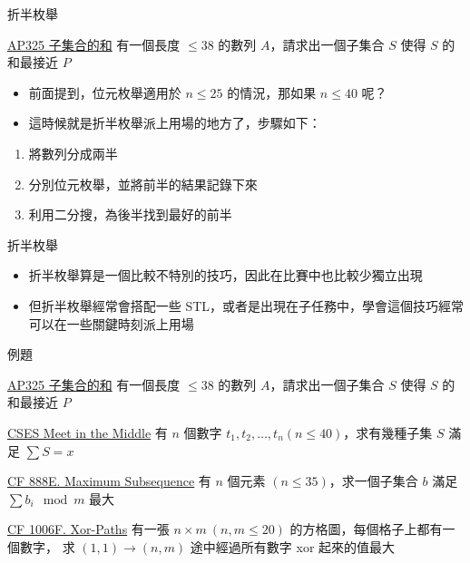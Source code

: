 \documentclass[aspectratio=169]{beamer}
\begin{document}
    \begin{frame}{折半枚舉}
        \begin{block}{\href{https://judge.tcirc.tw/ShowProblem?problemid=d019}{AP325 子集合的和}}
            有一個長度 $\le 38$ 的數列 $A$，請求出一個子集合 $S$ 使得 $S$ 的和最接近 $P$
        \end{block}

        \begin{itemize}
            \item<1-> 前面提到，位元枚舉適用於 $n \le 25$ 的情況，那如果 $n \le 40$ 呢？
            \item<2-> 這時候就是折半枚舉派上用場的地方了，步驟如下：
        \end{itemize}

        \begin{enumerate}
            \item 將數列分成兩半
            \item 分別位元枚舉，並將前半的結果記錄下來
            \item 利用二分搜，為後半找到最好的前半
        \end{enumerate}
    \end{frame}

    \begin{frame}{折半枚舉}
        \begin{itemize}
            \item 折半枚舉算是一個比較不特別的技巧，因此在比賽中也比較少獨立出現
            \item 但折半枚舉經常會搭配一些 STL，或者是出現在子任務中，學會這個技巧經常可以在一些關鍵時刻派上用場
        \end{itemize}
    \end{frame}

    \begin{frame}{例題}
        \begin{block}{\href{https://judge.tcirc.tw/ShowProblem?problemid=d019}{AP325 子集合的和}}
            有一個長度 $\le 38$ 的數列 $A$，請求出一個子集合 $S$ 使得 $S$ 的和最接近 $P$
        \end{block}

        \begin{block}{\href{https://cses.fi/problemset/task/1628/}{CSES Meet in the Middle}}
            有 $n$ 個數字 $t_1, t_2, \dots, t_n (n \le 40)$，求有幾種子集 $S$ 滿足 $\sum S = x$
        \end{block}

        \begin{block}{\href{https://codeforces.com/problemset/problem/888/E}{CF 888E. Maximum Subsequence}}
            有 $n$ 個元素 $(n \le 35)$，求一個子集合 $b$ 滿足 $\sum{b_i \mod m}$ 最大
        \end{block}

        \begin{block}{\href{https://codeforces.com/problemset/problem/1006/F}{CF 1006F. Xor-Paths}}
            有一張 $n \times m\ (n, m \le 20)$ 的方格圖，每個格子上都有一個數字，
            求 $(1, 1) \rightarrow (n, m)$ 途中經過所有數字 xor 起來的值最大
        \end{block}
    \end{frame}
\end{document}
